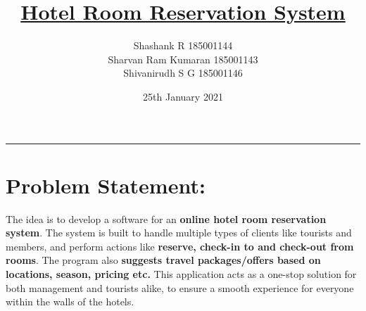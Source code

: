 \documentclass[12pt, letterpaper]{article}
\title{\textbf{\underline{Hotel Room Reservation System}}}
\author{{Shashank R 185001144}\\
		{Sharvan Ram Kumaran 185001143}\\
		{Shivanirudh S G 185001146}}
\date{25th January 2021}
\begin{document}
\maketitle
\hrule
\vspace{1cm}
\large{
\section*{\textbf{Problem Statement:}}
The idea is to develop a software for an \textbf{online hotel room reservation system}. The system is built to handle multiple types of clients like tourists and members, and perform actions like \textbf{reserve, check-in to and check-out from rooms}. The program also \textbf{suggests travel packages/offers based on locations, season, pricing etc.} This application acts as a one-stop solution for both management and tourists alike, to ensure a smooth experience for everyone within the walls of the hotels. 
}
\end{document}
